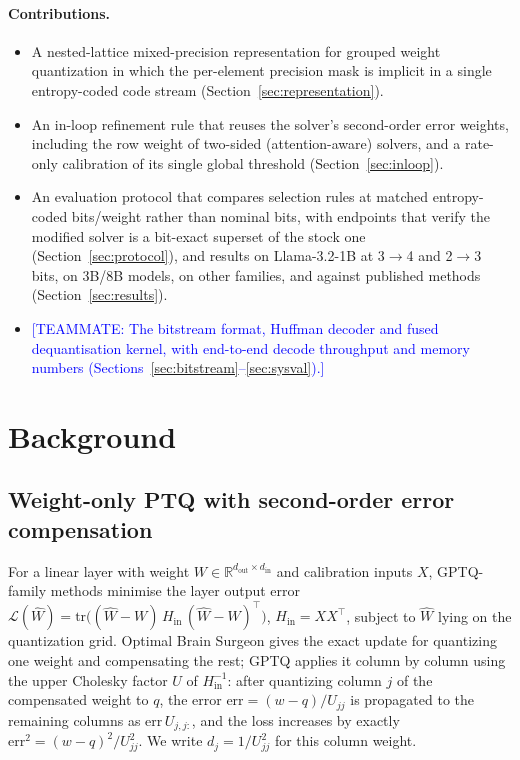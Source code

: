 \documentclass{article}
\newcommand{\teammate}[1]{\textcolor{blue}{[TEAMMATE: #1]}}
\newcommand{\tr}{\mathrm{tr}}
\newcommand{\Hin}{H_{\mathrm{in}}}
\begin{document}
\paragraph{Contributions.}
\begin{itemize}\itemsep 0pt
\item A nested-lattice mixed-precision representation for grouped weight
  quantization in which the per-element precision mask is implicit in a
  single entropy-coded code stream (Section~\ref{sec:representation}).
\item An in-loop refinement rule that reuses the solver's second-order
  error weights, including the row weight of two-sided (attention-aware)
  solvers, and a rate-only calibration of its single global threshold
  (Section~\ref{sec:inloop}).
\item An evaluation protocol that compares selection rules at matched
  entropy-coded bits/weight rather than nominal bits, with endpoints that
  verify the modified solver is a bit-exact superset of the stock one
  (Section~\ref{sec:protocol}), and results on Llama-3.2-1B at
  3$\to$4 and 2$\to$3 bits, on 3B/8B models, on other families, and
  against published methods (Section~\ref{sec:results}).
\item \teammate{The bitstream format, Huffman decoder and fused
  dequantisation kernel, with end-to-end decode throughput and memory
  numbers (Sections~\ref{sec:bitstream}--\ref{sec:sysval}).}
\end{itemize}

\section{Background}
\label{sec:background}

\subsection{Weight-only PTQ with second-order error compensation}

For a linear layer with weight $W \in \mathbb{R}^{d_{\mathrm{out}}\times
d_{\mathrm{in}}}$ and calibration inputs $X$, GPTQ-family methods
minimise the layer output error $\mathcal{L}(\hat W) = \tr\big((\hat W -
W)\,\Hin\,(\hat W - W)^\top\big)$, $\Hin = XX^\top$, subject to $\hat W$
lying on the quantization grid. Optimal Brain Surgeon
\citep{hassibi1993obs} gives the exact update for quantizing one weight
and compensating the rest; GPTQ \citep{frantar2023gptq} applies it column
by column using the upper Cholesky factor $U$ of $\Hin^{-1}$: after
quantizing column $j$ of the compensated weight to $q$, the error
$\mathrm{err} = (w-q)/U_{jj}$ is propagated to the remaining columns as
$\mathrm{err}\,U_{j,j:}$, and the loss increases by exactly
$\mathrm{err}^2 = (w-q)^2/U_{jj}^2$. We write $d_j = 1/U_{jj}^2$ for
this column weight.
\end{document}
